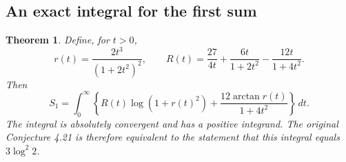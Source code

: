 \documentclass[11pt,a4paper]{article}
\newtheorem{theorem}{Theorem}[section]
\theoremstyle{remark}\newtheorem{remark}[theorem]{Remark}
\numberwithin{equation}{section}
\begin{document}
\subsection{An exact integral for the first sum}
\begin{theorem}\label{s421:thm:integral}
Define, for $t>0$,
\begin{equation}\label{s421:eq:rR}
 r(t)=\frac{2t^3}{(1+2t^2)^2},\qquad
 R(t)=\frac{27}{4t}+\frac{6t}{1+2t^2}-\frac{12t}{1+4t^2}.
\end{equation}
Then
\begin{equation}\label{s421:eq:remaining}
 S_1=\int_0^\infty\left\{
 R(t)\log(1+r(t)^2)+\frac{12\arctan r(t)}{1+4t^2}
 \right\}\,dt.
\end{equation}
The integral is absolutely convergent and has a positive integrand. The original Conjecture 4.21 is therefore equivalent to the statement that this integral equals $3\log^2 2$.
\end{theorem}
\end{document}
